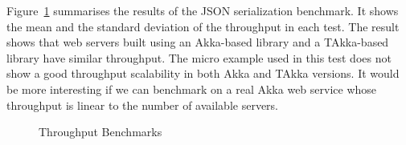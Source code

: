 Figure~\ref{fig:throughput} summarises the results of the JSON serialization 
benchmark.  It shows the mean and the standard deviation of the throughput 
in each test.  The result shows that web servers built using an Akka-based 
library and a TAkka-based library have similar throughput.  The micro example
used in this test does not show a good throughput scalability in both Akka
and TAkka versions.  It would be more interesting if we can benchmark on a real Akka web service
whose throughput is linear to the number of available servers.






\begin{figure}[h]
     \begin{center}
    \end{center}
     \caption{Throughput Benchmarks}
   \label{fig:throughput}
\end{figure}


